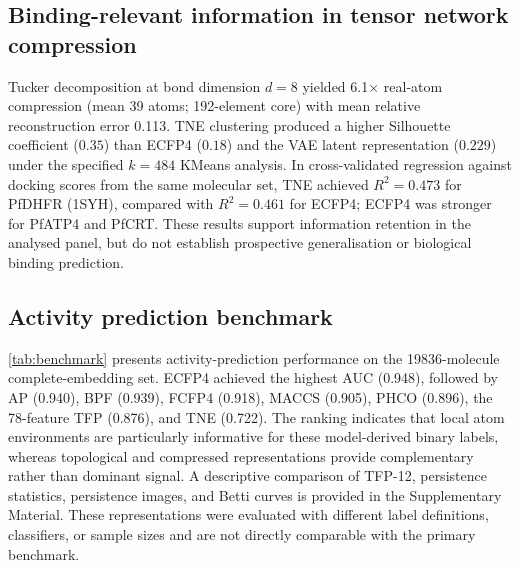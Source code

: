 \documentclass[11pt,a4paper]{article}
\begin{document}
\subsection{Binding-relevant information in tensor network compression}

Tucker decomposition at bond dimension $d = 8$ yielded \num{6.1}$\times$ real-atom compression (mean \num{39} atoms; \num{192}-element core) with mean relative reconstruction error \num{0.113}. TNE clustering produced a higher Silhouette coefficient ($\num{0.35}$) than ECFP4 ($\num{0.18}$) and the VAE latent representation ($\num{0.229}$) under the specified $k=484$ KMeans analysis. In cross-validated regression against docking scores from the same molecular set, TNE achieved $R^2=\num{0.473}$ for PfDHFR (1SYH), compared with $R^2=\num{0.461}$ for ECFP4; ECFP4 was stronger for PfATP4 and PfCRT. These results support information retention in the analysed panel, but do not establish prospective generalisation or biological binding prediction.

\subsection{Activity prediction benchmark}

\cref{tab:benchmark} presents activity-prediction performance on the \num{19836}-molecule complete-embedding set. ECFP4 achieved the highest AUC (\num{0.948}), followed by AP (\num{0.940}), BPF (\num{0.939}), FCFP4 (\num{0.918}), MACCS (\num{0.905}), PHCO (\num{0.896}), the 78-feature TFP (\num{0.876}), and TNE (\num{0.722}). The ranking indicates that local atom environments are particularly informative for these model-derived binary labels, whereas topological and compressed representations provide complementary rather than dominant signal. A descriptive comparison of TFP-12, persistence statistics, persistence images, and Betti curves is provided in the Supplementary Material. These representations were evaluated with different label definitions, classifiers, or sample sizes and are not directly comparable with the primary benchmark.
\end{document}
